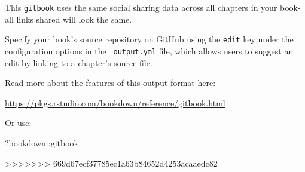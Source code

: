 \documentclass[]{book}
\newenvironment{Shaded}{\begin{snugshade}}{\end{snugshade}}
\newcommand{\NormalTok}[1]{{#1}}
\begin{document}
This \texttt{gitbook} uses the same social sharing data across all
chapters in your book- all links shared will look the same.

Specify your book's source repository on GitHub using the \texttt{edit}
key under the configuration options in the \texttt{\_output.yml} file,
which allows users to suggest an edit by linking to a chapter's source
file.

Read more about the features of this output format here:

\url{https://pkgs.rstudio.com/bookdown/reference/gitbook.html}

Or use:

\begin{Shaded}
\begin{Highlighting}[]
\NormalTok{?bookdown::gitbook}
\end{Highlighting}
\end{Shaded}

>>>>>>> 669d67ecf37785ec1a63b84652d4253acaaedc82

\end{document}
